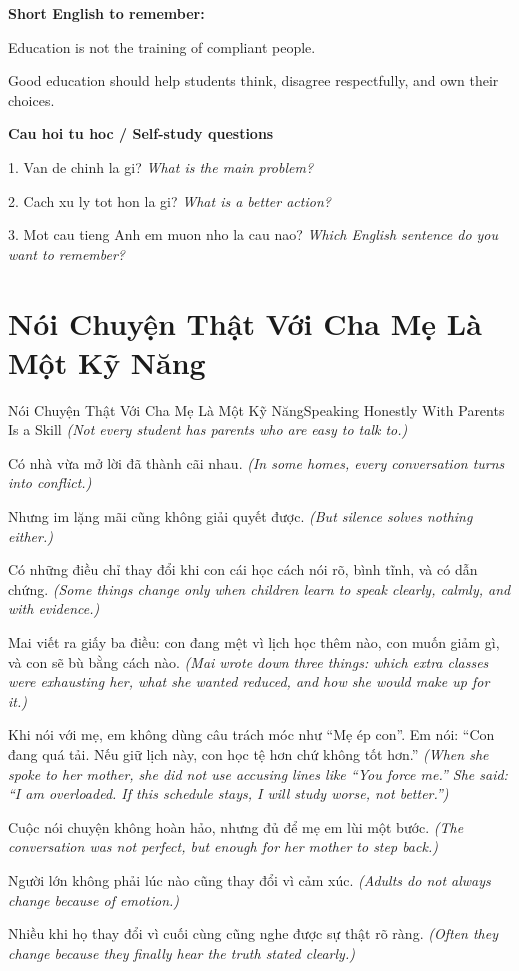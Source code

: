 \begin{ghinhoanh}
\textbf{Short English to remember:}

Education is not the training of compliant people.

Good education should help students think, disagree respectfully, and own their choices.

\end{ghinhoanh}

\begin{tuhocnhanh}
\textbf{Cau hoi tu hoc / Self-study questions}

1. Van de chinh la gi? \textit{What is the main problem?}

2. Cach xu ly tot hon la gi? \textit{What is a better action?}

3. Mot cau tieng Anh em muon nho la cau nao? \textit{Which English sentence do you want to remember?}
\end{tuhocnhanh}
\ngancach

\section{Nói Chuyện Thật Với Cha Mẹ Là Một Kỹ Năng}
\begin{truyen}{Nói Chuyện Thật Với Cha Mẹ Là Một Kỹ Năng}{Speaking Honestly With Parents Is a Skill}
\textit{(Not every student has parents who are easy to talk to.)}

Có nhà vừa mở lời đã thành cãi nhau.
\textit{(In some homes, every conversation turns into conflict.)}

Nhưng im lặng mãi cũng không giải quyết được.
\textit{(But silence solves nothing either.)}

Có những điều chỉ thay đổi khi con cái học cách nói rõ, bình tĩnh, và có dẫn chứng.
\textit{(Some things change only when children learn to speak clearly, calmly, and with evidence.)}

Mai viết ra giấy ba điều: con đang mệt vì lịch học thêm nào, con muốn giảm gì, và con sẽ bù bằng cách nào.
\textit{(Mai wrote down three things: which extra classes were exhausting her, what she wanted reduced, and how she would make up for it.)}

Khi nói với mẹ, em không dùng câu trách móc như ``Mẹ ép con''. Em nói: ``Con đang quá tải. Nếu giữ lịch này, con học tệ hơn chứ không tốt hơn.''
\textit{(When she spoke to her mother, she did not use accusing lines like ``You force me.'' She said: ``I am overloaded. If this schedule stays, I will study worse, not better.'')}

Cuộc nói chuyện không hoàn hảo, nhưng đủ để mẹ em lùi một bước.
\textit{(The conversation was not perfect, but enough for her mother to step back.)}

Người lớn không phải lúc nào cũng thay đổi vì cảm xúc.
\textit{(Adults do not always change because of emotion.)}

Nhiều khi họ thay đổi vì cuối cùng cũng nghe được sự thật rõ ràng.
\textit{(Often they change because they finally hear the truth stated clearly.)}

\end{truyen}

